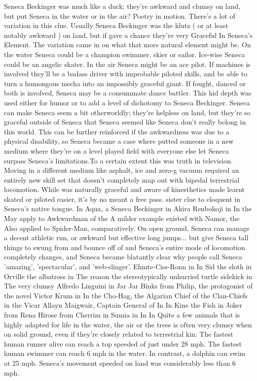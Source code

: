 \documentclass[12pt]{book}
\begin{document}
Seneca Beckinger was much like a duck: they're awkward and clumsy on land, but put Seneca in the water or in the air? Poetry in motion. There's a lot of variation in this clue. Usually Seneca Beckinger was the klutz ( or at least notably awkward ) on land, but if gave a chance they're very Graceful In Seneca's Element. The variation came in on what that more natural element might be. On the water Seneca could be a champion swimmer, skier or sailor. Ice-wise Seneca could be an angelic skater. In the air Seneca might be an ace pilot. If machines is involved they'll be a badass driver with improbable piloted skills, and be able to turn a humongous mecha into an impossibly graceful giant. If fought, danced or both is involved, Seneca may be a consummate dance battler. This hid depth was used either for humor or to add a level of dichotomy to Seneca Beckinger. Seneca can make Seneca seem a bit otherworldly; they're helpless on land, but they're so graceful outside of Seneca that Seneca seemed like Seneca don't really belong in this world. This can be further reinforced if the awkwardness was due to a physical disability, so Seneca became a case where putted someone in a new medium where they're on a level played field with everyone else let Seneca surpass Seneca's limitations.To a certain extent this was truth in television. Moving in a different medium like asphalt, ice and zero-g vacuum required an entirely new skill set that doesn't completely map out with bipedal terrestrial locomotion. While was naturally graceful and aware of kinesthetics made learnt skated or piloted easier, it's by no meant a free pass. sister clue to eloquent in Seneca's native tongue. In Aqua, a Seneca Beckinger in Akira Renbokoji in In the May apply to Awkwardman of the A milder example existed with Namor, the Also applied to Spider-Man, comparatively. On open ground, Seneca can manage a decent athletic run, or awkward but effective long jumps... but give Seneca tall things to swung from and bounce off of and Seneca's entire mode of locomotion completely changes, and Seneca became blatantly clear why people call Seneca 'amazing', 'spectacular', and 'web-slinger'. Ehmte-Ciss-Ronn in In Sid the sloth in Orville the albatross in The reason the stereotypically unhurried turtle sidekick in The very clumsy Alfredo Linguini in Jar Jar Binks from Philip, the protagonist of the novel Victor Krum in In the Cho-Hag, the Algarian Chief of the Clan-Chiefs in the Vicar Allayn Maigwair, Captain General of In In Kine the Fish in Joker from Rena Hirose from Cherrim in Sumia in In In Quite a few animals that is highly adapted for life in the water, the air or the trees is often very clumsy when on solid ground, even if they're closely related to terrestrial kin: The fastest human runner alive can reach a top speeded of just under 28 mph. The fastest human swimmer can reach 6 mph in the water. In contrast, a dolphin can swim at 25 mph. Seneca's movement speeded on land was considerably less than 6 mph.
\end{document}
